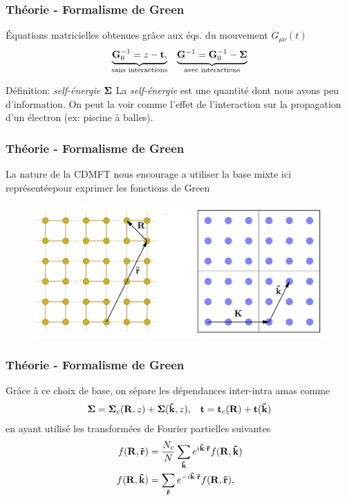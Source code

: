 \begin{frame}
    \frametitle{Théorie - Formalisme de Green}
    Équations matricielles obtenues grâce aux éqs. du mouvement $\dot{G}_{\mu\nu}(t)$
    \begin{align}
      \underbrace{\vb{G}_0^{-1} = z - \vb{t},}_{\text{sans interactions}}
        &&\underbrace{\vb{G}^{-1} = \vb{G}_0^{-1} - \vb{\Sigma}}_{\text{avec interactions}}
        \label{eq: greens}
    \end{align}
    \vfill
    \pause
    \begin{defblock}{Définition: \textit{self-énergie} $\vb{\Sigma}$}
      La \textit{self-énergie} est une quantité dont nous avons peu d'information.
      On peut la voir comme l'effet de l'interaction sur la propagation d'un électron
      (ex: piscine à balles).
    \end{defblock}
\end{frame}

\begin{frame}
    \frametitle{Théorie - Formalisme de Green}
    La nature de la CDMFT nous encourage a utiliser la base mixte ici
    représentée\footnotemark pour exprimer les fonctions de Green
    \begin{figure}
      \centering
      \includegraphics[scale=0.25]{./figures/theory/mixed_basis.png}
    \end{figure}
\end{frame}

\begin{frame}
    \frametitle{Théorie - Formalisme de Green}
    Grâce à ce choix de base, on sépare les dépendances inter-intra amas comme
    \begin{align*}
        \vb{\Sigma} = \vb{\Sigma}_c(\vb{R}, z) + \vb{\Sigma}(\vb{\tilde{k}}, z),
        &&\vb{t} = \vb{t}_c(\vb{R}) + \vb{t}(\vb{\tilde{k}})
    \end{align*}
    \vfill
    \pause
    en ayant utilisé les transformées de Fourier partielles suivantes
    \begin{align}
      f(\vb{R}, \vb{\Tilde{r}}) &= \frac{N_c}{N}\sum_{\vb{\Tilde{k}}}e^{i\vb{\Tilde{k}}\cdot\vb{\Tilde{r}}}f(\vb{R}, \vb{\Tilde{k}})\\
      f(\vb{R}, \vb{\Tilde{k}}) &= \sum_{\vb{\Tilde{r}}}e^{-i\vb{\Tilde{k}}\cdot\vb{\Tilde{r}}}f(\vb{R}, \vb{\Tilde{r}}),
      \label{eq: partial_fourier}
    \end{align}
\end{frame}
